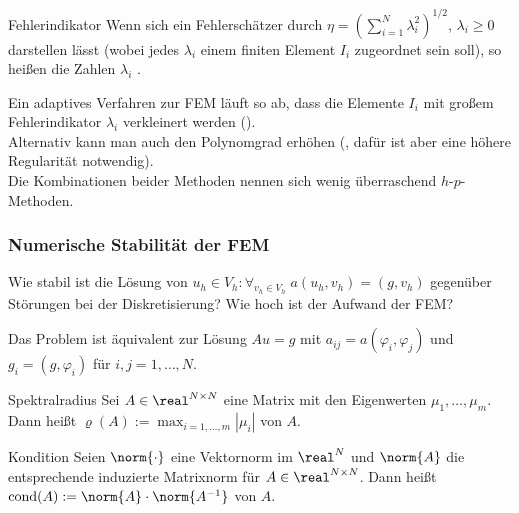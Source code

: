 \begin{Def}{Fehlerindikator}
    Wenn sich ein Fehlerschätzer durch
    $\eta = (\sum_{i=1}^N \lambda_i^2)^{1/2}$, $\lambda_i \ge 0$
    darstellen lässt (wobei jedes $\lambda_i$ einem finiten Element $I_i$
    zugeordnet sein soll), so heißen die Zahlen $\lambda_i$
    .
\end{Def}

\begin{Bem}
    Ein adaptives Verfahren zur FEM läuft so ab, dass die Elemente $I_i$ mit
    großem Fehlerindikator $\lambda_i$ verkleinert werden
    ().\\
    Alternativ kann man auch den Polynomgrad erhöhen
    (, dafür ist aber eine
    höhere Regularität notwendig).\\
    Die Kombinationen beider Methoden nennen sich wenig überraschend
    $h$-$p$-Methoden.
\end{Bem}

\pagebreak

\subsubsection{%
    Numerische Stabilität der FEM%
}

\begin{Bem}
    Wie stabil ist die Lösung von
    $u_h \in V_h\colon \forall_{v_h \in V_h}\; a(u_h, v_h) = (g, v_h)$
    gegenüber Störungen bei der Diskretisierung?
    Wie hoch ist der Aufwand der FEM?
\end{Bem}

\begin{Bem}
    Das Problem ist äquivalent zur Lösung $Au = g$ mit
    $a_{ij} = a(\varphi_i, \varphi_j)$ und $g_i = (g, \varphi_i)$
    für $i, j = 1, \dotsc, N$.
\end{Bem}

\begin{Def}{Spektralradius}
    Sei $A \in \real^{N \times N}$ eine Matrix mit
    den Eigenwerten $\mu_1, \dotsc, \mu_m$.\\
    Dann heißt $\varrho(A) := \max_{i=1,\dotsc,m} |\mu_i|$
     von $A$.
\end{Def}

\begin{Def}{Kondition}
    Seien $\norm{\cdot}$ eine Vektornorm im $\real^N$ und
    $\norm{A}$ die entsprechende induzierte Matrixnorm für
    $A \in \real^{N \times N}$.
    Dann heißt $\cond(A) := \norm{A} \cdot \norm{A^{-1}}$
     von $A$.
\end{Def}

